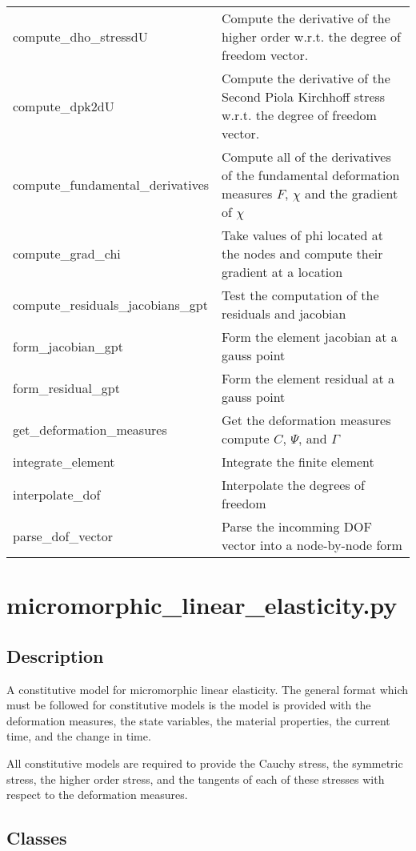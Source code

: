 \documentclass{asme2ej}
\begin{document}
\begin{longtable}{ p{}  p{} }
compute\_dho\_stressdU & Compute the derivative of the higher order w.r.t. the degree of freedom vector.\\
compute\_dpk2dU & Compute the derivative of the Second Piola Kirchhoff stress w.r.t. the degree of freedom vector.\\
compute\_fundamental\_derivatives & Compute all of the derivatives of the fundamental deformation measures $F$, $\chi$ and the gradient of $\chi$\\
compute\_grad\_chi & Take values of phi located at the nodes and compute their gradient at a location\\
compute\_residuals\_jacobians\_gpt & Test the computation of the residuals and jacobian\\
form\_jacobian\_gpt & Form the element jacobian at a gauss point\\
form\_residual\_gpt & Form the element residual at a gauss point\\
get\_deformation\_measures & Get the deformation measures compute $C$, $\Psi$, and $\Gamma$\\
integrate\_element & Integrate the finite element\\
interpolate\_dof & Interpolate the degrees of freedom\\
parse\_dof\_vector & Parse the incomming DOF vector into a node-by-node form\\
\hline
\end{longtable}

\clearpage
\section{micromorphic\_linear\_elasticity.py}

\subsection{Description}

A constitutive model for micromorphic linear elasticity. The general format which must be followed for constitutive models is the model is provided with the deformation measures, the state variables, the material properties, the current time, and the change in time.

All constitutive models are required to provide the Cauchy stress, the symmetric stress, the higher order stress, and the tangents of each of these stresses with respect to the deformation measures.

\subsection{Classes}
\end{document}
